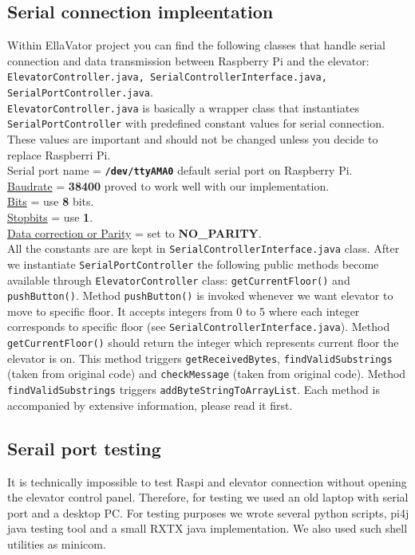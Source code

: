 \documentclass[a4paper, 12pt]{article}
\begin{document}
\subsection{Serial connection impleentation}
Within EllaVator project you can find the following classes that handle serial connection and data transmission between Raspberry Pi and the elevator: \texttt{ElevatorController.java, SerialControllerInterface.java, SerialPortController.java}.\\
\texttt{ElevatorController.java} is basically a wrapper class that instantiates \texttt{SerialPortController} with predefined constant values for serial connection.
These values are important and should not be changed unless you decide to replace Raspberri Pi.\\
Serial port name = \textbf{\texttt{/dev/ttyAMA0}} default serial port on Raspberry Pi.\\
\href{https://en.wikipedia.org/wiki/Serial\_port\#Speed}{Baudrate} = \textbf{38400} proved to work well with our implementation.\\
\href{https://en.wikipedia.org/wiki/Serial\_port\#Data_bits}{Bits} = use \textbf{8} bits.\\
\href{https://en.wikipedia.org/wiki/Serial\_port\#Stop_bits}{Stopbits} = use \textbf{1}.\\
\href{https://en.wikipedia.org/wiki/Serial\_port\#Parity}{Data correction or Parity} = set to \textbf{NO\_PARITY}.\\

All the constants are are kept in \texttt{SerialControllerInterface.java} class.
After we instantiate \texttt{SerialPortController} the following public methods become available through \texttt{ElevatorController} class: \texttt{getCurrentFloor()} and \texttt{pushButton()}. 
Method \texttt{pushButton()} is invoked whenever we want elevator to move to specific floor.
It accepts integers from 0 to 5 where each integer corresponds to specific floor (see \texttt{SerialControllerInterface.java}). 
Method \texttt{getCurrentFloor()} should return the integer which represents current floor the elevator is on.
This method triggers \texttt{getReceivedBytes}, \texttt{findValidSubstrings} (taken from original code) and \texttt{checkMessage} (taken from original code).
Method \texttt{findValidSubstrings} triggers \texttt{addByteStringToArrayList}.
Each method is accompanied by extensive information, please read it first.

\subsection{Serail port testing}
It is technically impossible to test Raspi and elevator connection without opening the elevator control panel.
Therefore, for testing we used an old laptop with serial port and a desktop PC.
For testing purposes we wrote several python scripts, pi4j java testing tool and a small RXTX java implementation.
We also used such shell utilities as minicom.
\\
\end{document}
